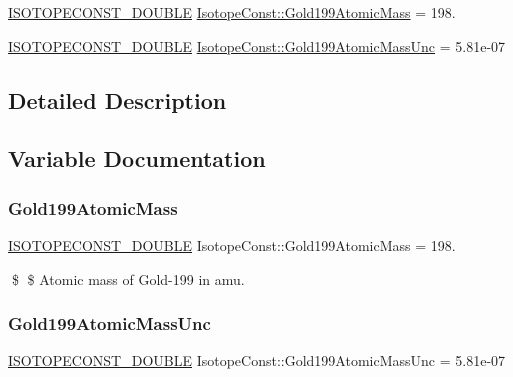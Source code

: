 \begin{DoxyCompactItemize}
\item 
\mbox{\hyperlink{group___isotope_const-_macros_ga8f45a7272ce02c0b4c65c44636ed719a}{I\+S\+O\+T\+O\+P\+E\+C\+O\+N\+S\+T\+\_\+\+D\+O\+U\+B\+LE}} \mbox{\hyperlink{group___isotope_const-_gold-_au199_gacd3cd59987118bdef2beec644ad7520f}{Isotope\+Const\+::\+Gold199\+Atomic\+Mass}} = 198.
\item 
\mbox{\hyperlink{group___isotope_const-_macros_ga8f45a7272ce02c0b4c65c44636ed719a}{I\+S\+O\+T\+O\+P\+E\+C\+O\+N\+S\+T\+\_\+\+D\+O\+U\+B\+LE}} \mbox{\hyperlink{group___isotope_const-_gold-_au199_gadcc7b93e1fba66050c2ae4a2d747b74a}{Isotope\+Const\+::\+Gold199\+Atomic\+Mass\+Unc}} = 5.\+81e-\/07
\end{DoxyCompactItemize}


\subsection{Detailed Description}


\subsection{Variable Documentation}
\mbox{\label{group___isotope_const-_gold-_au199_gacd3cd59987118bdef2beec644ad7520f}} 
\subsubsection{\texorpdfstring{Gold199\+Atomic\+Mass}{Gold199AtomicMass}}
{\footnotesize\ttfamily \mbox{\hyperlink{group___isotope_const-_macros_ga8f45a7272ce02c0b4c65c44636ed719a}{I\+S\+O\+T\+O\+P\+E\+C\+O\+N\+S\+T\+\_\+\+D\+O\+U\+B\+LE}} Isotope\+Const\+::\+Gold199\+Atomic\+Mass = 198.}

\$ \$ Atomic mass of Gold-\/199 in amu. \mbox{\label{group___isotope_const-_gold-_au199_gadcc7b93e1fba66050c2ae4a2d747b74a}} 
\subsubsection{\texorpdfstring{Gold199\+Atomic\+Mass\+Unc}{Gold199AtomicMassUnc}}
{\footnotesize\ttfamily \mbox{\hyperlink{group___isotope_const-_macros_ga8f45a7272ce02c0b4c65c44636ed719a}{I\+S\+O\+T\+O\+P\+E\+C\+O\+N\+S\+T\+\_\+\+D\+O\+U\+B\+LE}} Isotope\+Const\+::\+Gold199\+Atomic\+Mass\+Unc = 5.\+81e-\/07}

